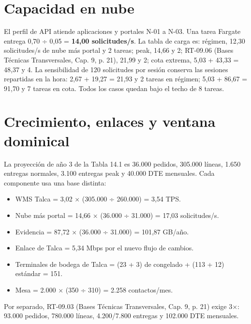 \section{Capacidad en nube}
\label{sec:anexo-4b-nube}

El perfil de API atiende aplicaciones y portales N-01 a N-03. Una tarea Fargate entrega 0,70 ÷ 0,05 = \textbf{14,00 solicitudes/s}. La tabla de carga es: régimen, 12,30 solicitudes/s de nube más portal y 2 tareas; peak, 14,66 y 2; RT-09.06 (Bases Técnicas Transversales, Cap. 9, p. 21), 21,99 y 2; cota extrema, 5,03 + 43,33 = 48,37 y 4. La sensibilidad de 120 solicitudes por sesión conserva las sesiones repartidas en la hora: 2,67 + 19,27 = 21,93 y 2 tareas en régimen; 5,03 + 86,67 = 91,70 y 7 tareas en cota. Todos los casos quedan bajo el techo de 8 tareas.

\section{Crecimiento, enlaces y ventana dominical}
\label{sec:anexo-4b-crecimiento}

La proyección de año 3 de la Tabla 14.1 es 36.000 pedidos, 305.000 líneas, 1.650 entregas normales, 3.100 entregas peak y 40.000 DTE mensuales. Cada componente usa una base distinta:

\begin{itemize}
  \item WMS Talca = 3,02 × (305.000 ÷ 260.000) = 3,54 TPS.
  \item Nube más portal = 14,66 × (36.000 ÷ 31.000) = 17,03 solicitudes/s.
  \item Evidencia = 87,72 × (36.000 ÷ 31.000) = 101,87 GB/año.
  \item Enlace de Talca = 5,34 Mbps por el nuevo flujo de cambios.
  \item Terminales de bodega de Talca = (23 + 3) de congelado + (113 + 12) estándar = 151.
  \item Mesa = 2.000 × (350 ÷ 310) = 2.258 contactos/mes.
\end{itemize}

Por separado, RT-09.03 (Bases Técnicas Transversales, Cap. 9, p. 21) exige 3×: 93.000 pedidos, 780.000 líneas, 4.200/7.800 entregas y 102.000 DTE mensuales.

